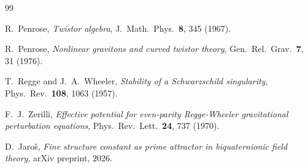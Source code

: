 \documentclass[11pt,a4paper]{article}
\theoremstyle{definition}
\theoremstyle{remark}
\begin{document}
\begin{thebibliography}{99}

R.~Penrose, \emph{Twistor algebra}, J.\ Math.\ Phys.\ \textbf{8}, 345 (1967).

R.~Penrose, \emph{Nonlinear gravitons and curved twistor theory},
Gen.\ Rel.\ Grav.\ \textbf{7}, 31 (1976).

T.~Regge and J.~A.~Wheeler, \emph{Stability of a Schwarzschild singularity},
Phys.\ Rev.\ \textbf{108}, 1063 (1957).

F.~J.~Zerilli, \emph{Effective potential for even-parity Regge-Wheeler
gravitational perturbation equations},
Phys.\ Rev.\ Lett.\ \textbf{24}, 737 (1970).

D.~Jaroš, \emph{Fine structure constant as prime attractor in biquaternionic
field theory}, arXiv preprint, 2026.

\end{thebibliography}
\end{document}
